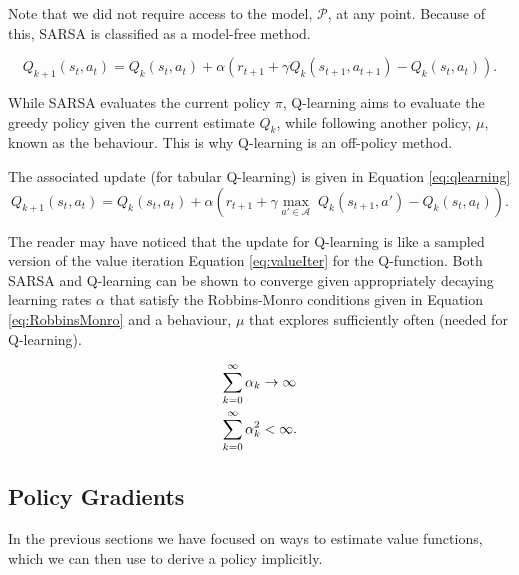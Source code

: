 \documentclass{report}
\numberwithin{equation}{section}
\numberwithin{figure}{section}
\numberwithin{table}{section}
\numberwithin{algorithm}{section}
\begin{document}
Note that we did not require access to the model, $\mathcal{P}$, at 
any point. Because of this, SARSA is classified as a model-free method.

\begin{equation}\label{eq:sarsa}
  Q_{k+1}(s_t, a_t) = Q_{k}(s_t, a_t) + \alpha (r_{t+1} + \gamma Q_{k}(s_{t+1}, a_{t+1}) - Q_{k}(s_t, a_t)).
\end{equation}


While SARSA evaluates the current policy $\pi$, Q-learning aims 
to evaluate the greedy policy given the current estimate $Q_{k}$, 
while following another policy, $\mu$, known as the behaviour. 
This is why Q-learning is an off-policy method.

The associated update (for tabular Q-learning) is given in Equation 
\ref{eq:qlearning}
\begin{equation}\label{eq:qlearning}
  Q_{k+1}(s_t, a_t) = Q_{k}(s_t, a_t) + \alpha \left(r_{t+1} + \gamma \max_{a'\in\mathcal{A}}\;Q_{k}(s_{t+1}, a') - Q_{k}(s_t, a_t)\right).
\end{equation}

The reader may have noticed that the update for Q-learning is like 
a sampled version of the value iteration Equation \ref{eq:valueIter} 
for the Q-function. Both SARSA and Q-learning can be shown to 
converge given appropriately decaying learning rates $\alpha$ 
that satisfy the Robbins-Monro conditions given in Equation 
\ref{eq:RobbinsMonro} and a behaviour, $\mu$ that explores 
sufficiently often (needed for Q-learning).

\begin{align}\label{eq:RobbinsMonro}
  \sum_{k=0}^\infty \alpha_k&\rightarrow \infty\notag\\
  \sum_{k=0}^\infty \alpha_k^2&< \infty.
\end{align}

\subsection{Policy Gradients}\label{sec:PolicyGrads}
In the previous sections we have focused on ways to estimate 
value functions, which we can then use to derive a policy implicitly. 
\end{document}
